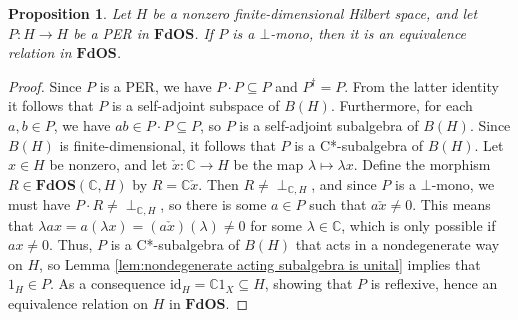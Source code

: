 \documentclass[12pt]{tac}
\newtheorem{proposition}[theorem]{Proposition}
\theoremstyle{definition}
\theoremstyle{remark}
\newcommand{\CC}{\mathbb C}
\newcommand{\<}{\langle}
\renewcommand{\>}{\rangle}
\renewcommand{\:}{\colon}
\newcommand{\id}{\mathrm{id}}
\begin{document}
\begin{proposition}\label{prop:PERs in FdOS}
    Let $H$ be a nonzero finite-dimensional Hilbert space, and let $P:H\to H$ be a PER in $\mathbf{FdOS}$. If $P$ is a $\bot$-mono, then it is an equivalence relation in $\mathbf{FdOS}$. 
\end{proposition}
\begin{proof}
Since $P$ is a PER, we have $P\cdot P\subseteq P$ and $P^\dag=P$. From the latter identity it follows that $P$ is a self-adjoint subspace of $B(H)$. Furthermore, for each $a,b\in P$, we have $ab\in P\cdot P\subseteq P$, so $P$ is a self-adjoint subalgebra of $B(H)$. Since $B(H)$ is finite-dimensional, it follows that $P$ is a C*-subalgebra of $B(H)$. Let $x\in H$ be nonzero, and let $\check x:\CC\to H$ be the map $\lambda\mapsto\lambda x$. Define the morphism $R\in\mathbf{FdOS}(\CC,H)$ by $R=\CC\check x$. Then $R\neq\perp_{\CC,H}$, and since $P$ is a $\bot$-mono, we must have $P\cdot R\neq\perp_{\CC,H}$, so there is some $a\in P$ such that $a\check x\neq 0$. This means that $\lambda ax=a(\lambda x)=(a\check x)(\lambda)\neq 0$ for some $\lambda\in\CC$, which is only possible if $ax\neq 0$. Thus, $P$ is a C*-subalgebra of $B(H)$ that acts in a nondegenerate way on $H$, so  Lemma \ref{lem:nondegenerate acting subalgebra is unital} implies that $1_H\in P$. As a consequence $\id_H=\CC 1_X\subseteq H$, showing that $P$ is reflexive, hence an equivalence relation on $H$ in $\mathbf{FdOS}$.
    \end{proof}
\end{document}
